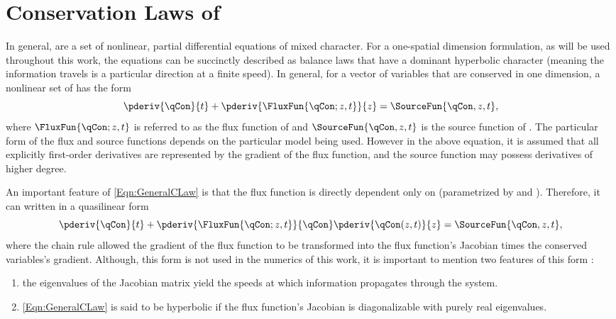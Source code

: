 \section{Conservation Laws of \THcc}
In general, \CLaws are a set of nonlinear, partial differential equations of mixed character.
For a one-spatial dimension formulation, as will be used throughout this work, the equations can be succinctly described as balance laws that have a dominant hyperbolic character (meaning the information travels is a particular direction at a finite speed).
In general, for a vector of variables \qCon that are conserved in one dimension, a nonlinear set of \CLaws has the form
\begin{equation}
    \pderiv{\qCon}{t} + \pderiv{\FluxFun{\qCon; z,t}}{z} = \SourceFun{\qCon,z,t},
\label{Eqn:GeneralCLaw}
\end{equation}
where $\FluxFun{\qCon;z,t}$ is referred to as the flux function of \qCon and $\SourceFun{\qCon,z,t}$ is the source function of \qCon.
The particular form of the flux and source functions depends on the particular model being used.
However in the above equation, it is assumed that all explicitly first-order derivatives are represented by the gradient of the flux function, and the source function may possess derivatives of higher degree.

An important feature of \cref{Eqn:GeneralCLaw} is that the flux function is directly dependent only on \qCon (parametrized by \Space and \Time).  Therefore, it can written in a quasilinear form
\begin{equation}
    \pderiv{\qCon}{t} + \pderiv{\FluxFun{\qCon;z,t}}{\qCon}\pderiv{\qCon(z,t)}{z} = \SourceFun{\qCon,z,t},
\label{Eqn:GeneralCLawQuasilinear}
\end{equation}
where the chain rule allowed the gradient of the flux function to be transformed into the flux function's Jacobian times the conserved variables's gradient.
Although, this form is not used in the numerics of this work, it is important to mention two features of this form \cite{leveque_finite_2002}:
\vspace*{-0.75em}
\begin{enumerate}
    \item{the eigenvalues of the Jacobian matrix yield the speeds at which information propagates through the system.}
    \item{\cref{Eqn:GeneralCLaw} is said to be hyperbolic if the flux function's Jacobian is diagonalizable with purely real eigenvalues.}
\end{enumerate}

